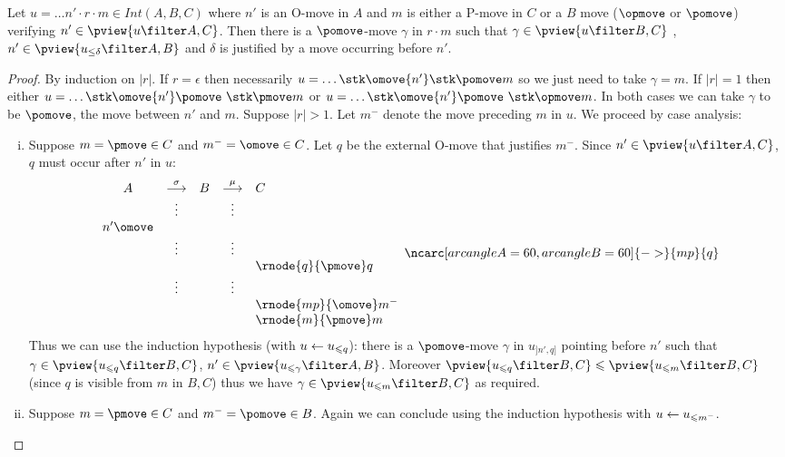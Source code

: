 \begin{lemma}
\label{lem:middlepomove}
Let $u = \ldots n' \cdot r \cdot m \in Int(A,B,C)$ where
$n'$ is an O-move in $A$ and $m$ is either a P-move in $C$ or a $B$ move ($\opmove$ or $\pomove$) verifying $n' \in \pview{u\filter A,C}$. Then there is a $\pomove$-move $\gamma$ in $r \cdot m$ such that $\gamma \in \pview{u\filter B,C}$ , $n' \in \pview{u_{\leq \delta} \filter A,B}$ and $\delta$ is justified by a move occurring before $n'$.
\end{lemma}
\begin{proof}
By induction on $|r|$.
If $r=\epsilon$ then necessarily $u = \ldots \stk \omove {n'} \stk \pomove m$ so we just need to take $\gamma = m$.
If $|r|=1$ then either 
$u = \ldots \stk \omove {n'} \pomove~\stk \pmove m$
or $u = \ldots \stk \omove {n'} \pomove~\stk \opmove m$.
In both cases we can take $\gamma$ to be $\pomove$, the move between $n'$ and $m$.
Suppose $|r|>1$. Let $m^-$ denote the move preceding $m$ in $u$.
We proceed by case analysis:
\begin{enumerate}[i.]
\item Suppose $m = \pmove \in C$ and $m^- = \omove \in C$.
Let $q$ be the external O-move that justifies $m^-$.
Since $n' \in \pview{u\filter A,C}$, $q$ must occur after $n'$ in $u$:
$$ 
\begin{array}{ccccl}
A & \stackrel\sigma{\longrightarrow} & B & \stackrel\mu{\longrightarrow} & C \\
&\vdots&&\vdots\\
n' \omove\\
&\vdots&&\vdots  \\
&& & &  \rnode{q}{\pmove}q  \\
&\vdots&&\vdots  \\
&& & &  \rnode{mp}{\omove}m^-  \\
&& & &  \rnode{m}{\pmove}m  \\
\end{array}
\ncarc[arcangleA=60,arcangleB=60]{->}{mp}{q}
 $$  
Thus we can use the induction hypothesis (with $u\leftarrow u_{\leqslant q}$): there is a $\pomove$-move $\gamma$ 
in $u_{]n',q]}$ pointing before $n'$ such that $\gamma \in \pview{u_{\prefixof q} \filter B,C}$, $n' \in \pview{u_{\prefixof \gamma} \filter A,B}$.
Moreover $\pview{u_{\prefixof q} \filter B,C} \prefixof \pview{u_{\prefixof m} \filter B,C}$ (since $q$ is visible from $m$ in $B,C$) thus we have $\gamma \in \pview{u_{\prefixof m} \filter B,C}$ as required.

\item Suppose $m = \pmove \in C$ and $m^- = \pomove \in B$.
Again we can conclude using 
the induction hypothesis with $u \leftarrow u_{\leqslant m^-}$.


\end{enumerate}
\end{proof}
